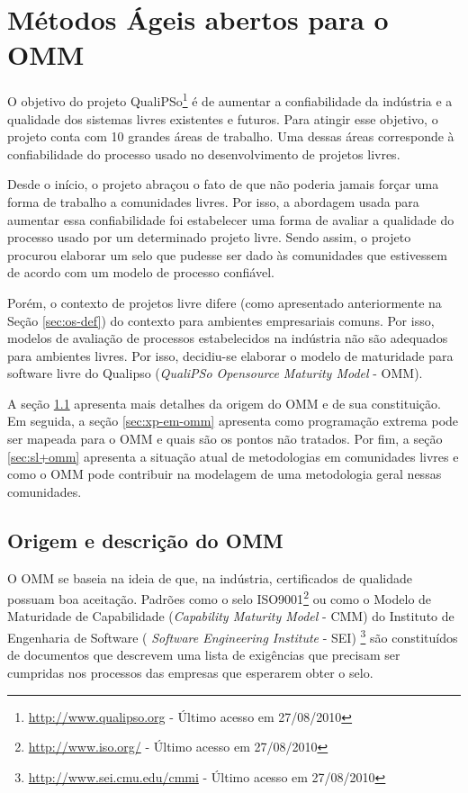 \chapter{Métodos Ágeis abertos para o OMM}
\label{cap:omm}

O objetivo do projeto QualiPSo\footnote{\url{http://www.qualipso.org}
  - Último acesso em 27/08/2010} é de aumentar a confiabilidade da
indústria e a qualidade dos sistemas livres existentes e futuros. Para
atingir esse objetivo, o projeto conta com 10 grandes áreas de
trabalho. Uma dessas áreas corresponde à confiabilidade do processo
usado no desenvolvimento de projetos livres.

Desde o início, o projeto abraçou o fato de que não poderia jamais
forçar uma forma de trabalho a comunidades livres. Por isso, a
abordagem usada para aumentar essa confiabilidade foi estabelecer uma
forma de avaliar a qualidade do processo usado por um determinado
projeto livre. Sendo assim, o projeto procurou elaborar um selo que
pudesse ser dado às comunidades que estivessem de acordo com um modelo
de processo confiável.

Porém, o contexto de projetos livre difere (como apresentado
anteriormente na Seção \ref{sec:os-def}) do contexto para ambientes
empresariais comuns. Por isso, modelos de avaliação de processos
estabelecidos na indústria não são adequados para ambientes
livres. Por isso, decidiu-se elaborar o modelo de maturidade para
software livre do Qualipso (\textit{QualiPSo Opensource Maturity
  Model} - OMM).

A seção \ref{sec:o-que-eh-omm} apresenta mais detalhes da origem do
OMM e de sua constituição. Em seguida, a seção \ref{sec:xp-em-omm}
apresenta como programação extrema pode ser mapeada para o OMM e quais
são os pontos não tratados. Por fim, a seção
\ref{sec:sl+omm} apresenta a situação atual de metodologias em
comunidades livres e como o OMM pode contribuir na modelagem de uma
metodologia geral nessas comunidades.

\section{Origem e descrição do OMM}
\label{sec:o-que-eh-omm}

O OMM se baseia na ideia de que, na indústria, certificados de
qualidade possuam boa aceitação. Padrões como o selo
ISO9001\footnote{\url{http://www.iso.org/} - Último acesso em
  27/08/2010} ou como o Modelo de Maturidade de Capabilidade
(\textit{Capability Maturity Model} - CMM) do Instituto de Engenharia
de Software ( \textit{Software Engineering Institute} - SEI)
\footnote{\url{http://www.sei.cmu.edu/cmmi} - Último acesso em
  27/08/2010} são constituídos de documentos que descrevem uma lista
de exigências que precisam ser cumpridas nos processos das empresas
que esperarem obter o selo.

